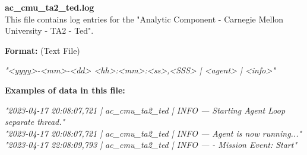 \begin{description}
\begin{addmargin}[0em]{0em}
    \label{ac_cmu_ta2_ted.log}
    \begin{addmargin}[1em]{0em} %
        \textbf{ac\_cmu\_ta2\_ted.log}\\
        This file contains log entries for the "Analytic Component - Carnegie Mellon University - TA2 - Ted".
        \begin{addmargin}[1em]{0em}
            \textbf{Format:} (Text File)
            \begin{addmargin}[1em]{0em}
                \textit{"<yyyy>-<mm>-<dd> <hh>:<mm>:<ss>,<SSS> | <agent> | <info>"}
            \end{addmargin}
        \end{addmargin}
        \begin{addmargin}[1em]{0em}
            \textbf{Examples of data in this file:}
            \begin{addmargin}[1em]{0em}\textit{"2023-04-17 20:08:07,721 | ac\_cmu\_ta2\_ted | INFO — Starting Agent Loop separate thread."\\
                "2023-04-17 20:08:07,721 | ac\_cmu\_ta2\_ted | INFO — Agent is now running..."\\
                "2023-04-17 22:08:09,793 | ac\_cmu\_ta2\_ted | INFO —  - Mission Event: Start"}
            \end{addmargin}
        \end{addmargin}
    \end{addmargin} %
    \textbf{\\}


\end{addmargin}
\end{description}
